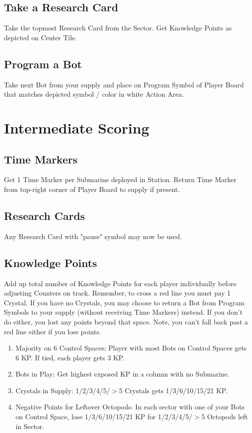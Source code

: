 \documentclass[12pt]{article}
\newenvironment{enumerateCustom}
{\begin{enumerate}
  \setlength{\itemsep}{1pt}
  \setlength{\parskip}{0pt}
  \setlength{\parsep}{0pt}}
{\end{enumerate}}
\begin{document}
\begin{multicols*}{2}
\subsection*{Take a Research Card}
Take the topmost Research Card from the Sector. Get Knowledge Points as depicted on Center Tile.

\subsection*{Program a Bot}
Take next Bot from your supply and place on Program Symbol of Player Board that matches depicted symbol / color in white Action Area.

\section*{Intermediate Scoring}
\subsection*{Time Markers}
Get 1 Time Marker per Submarine deployed in Station. Return Time Marker from top-right corner of Player Board to supply if present.

\subsection*{Research Cards}
Any Research Card with "pause" symbol may now be used.

\subsection*{Knowledge Points}
Add up total number of Knowledge Points for each player individually before adjusting Counters on track. Remember, to cross a red line you must pay 1 Crystal. If you have no Crystals, you may choose to return a Bot from Program Symbols to your supply (without receiving Time Markers) instead. If you don't do either, you lost any points beyond that space. Note, you can't fall back past a red line either if you lose points.

\begin{enumerateCustom}
    \item Majority on 6 Control Spaces: Player with most Bots on Control Spaces gets 6 KP. If tied, each player gets 3 KP.
    \item Bots in Play: Get highest exposed KP in a column with no Submarine.
    \item Crystals in Supply: 1/2/3/4/5/$>$5 Crystals gets 1/3/6/10/15/21 KP.
    \item Negative Points for Leftover Octopods: In each sector with one of your Bots on Control Space, lose 1/3/6/10/15/21 KP for 1/2/3/4/5/$>$5 Octopods left in Sector.
\end{enumerateCustom}


\end{multicols*}
\end{document}
